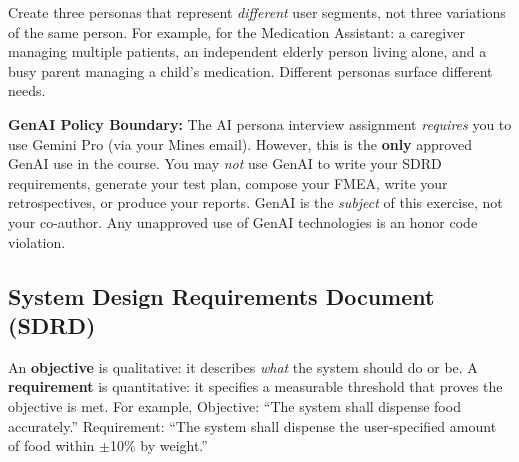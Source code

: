 \begin{protip}
Create three personas that represent \textit{different} user segments, not three variations of the same person. For example, for the Medication Assistant: a caregiver managing multiple patients, an independent elderly person living alone, and a busy parent managing a child's medication. Different personas surface different needs.
\end{protip}

\begin{warnbox}
\textbf{GenAI Policy Boundary:} The AI persona interview assignment \textit{requires} you to use Gemini Pro (via your Mines email). However, this is the \textbf{only} approved GenAI use in the course. You may \textit{not} use GenAI to write your SDRD requirements, generate your test plan, compose your FMEA, write your retrospectives, or produce your reports. GenAI is the \textit{subject} of this exercise, not your co-author. Any unapproved use of GenAI technologies is an honor code violation.
\end{warnbox}

\subsection{System Design Requirements Document (SDRD)}

\begin{faqbox}
An \textbf{objective} is qualitative: it describes \textit{what} the system should do or be. A \textbf{requirement} is quantitative: it specifies a measurable threshold that proves the objective is met. For example, Objective: ``The system shall dispense food accurately.'' Requirement: ``The system shall dispense the user-specified amount of food within $\pm$10\% by weight.''
\end{faqbox}

